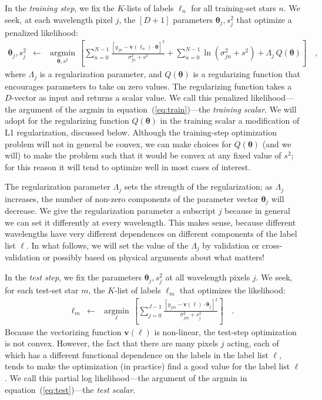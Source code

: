 \documentclass[12pt,preprint]{aastex}
\newcommand{\Dvector}[1]{\boldsymbol{#1}}
\newcommand{\vectheta}{\Dvector{\theta}}
\newcommand{\vecv}{\Dvector{v}}
\newcommand{\argmin}[1]{\underset{#1}{\operatorname{argmin}}\,}
\begin{document}
In the \emph{training step}, we fix the $K$-lists of labels $\ell_n$
for all training-set stars $n$.
We seek, at each wavelength pixel $j$, the $[D+1]$ parameters
$\vectheta_j,s^2_j$ that optimize a penalized likelihood:
\begin{eqnarray}\label{eq:train}
  \vectheta_j,s^2_j &\leftarrow& \argmin{\vectheta,s^2}\left[
    \sum_{n=0}^{N-1} \frac{[y_{jn}-\vecv(\ell_n)\cdot\vectheta]^2}{\sigma^2_{jn}+s^2}
    + \sum_{n=0}^{N-1} \ln(\sigma^2_{jn}+s^2)
    + \Lambda_j\,Q(\vectheta)
    \right]
  \quad ,
\end{eqnarray}
where $\Lambda_j$ is a regularization parameter, and $Q(\vectheta)$ is a 
regularizing function that encourages parameters to take on zero values.
The regularizing function takes a $D$-vector as input and returns a
scalar value.
We call this penalized likelihood---the argument of the
argmin in equation~(\ref{eq:train})---the \emph{training scalar}.
We will adopt for the regularizing function $Q(\vectheta)$ in the training scalar a
modification of L1 regularization, discussed below.
Although the training-step optimization problem will not in general be
convex, we can make choices for $Q(\vectheta)$ (and we will) to make the
problem such that it would be convex at any fixed value of $s^2$; for
this reason it will tend to optimize well in most cases of interest.

The regularization parameter $\Lambda_j$ sets the strength of the
regularization; as $\Lambda_j$ increases, the number of non-zero
components of the parameter vector $\vectheta_j$ will decrease.
We give the regularization parameter a subscript $j$ because in
general we can set it differently at every wavelength.
This makes sense, because different wavelengths have very different
dependences on different components of the label list $\ell$.
In what follows, we will set the value of the $\Lambda_j$ by
validation or cross-validation or possibly based on physical arguments
about what matters!

In the \emph{test step}, we fix the parameters $\vectheta_j,s^2_j$ at all
wavelength pixels $j$.
We seek, for each test-set star $m$, the $K$-list of labels $\ell_m$
that optimizes the likelihood:
\begin{eqnarray}\label{eq:test}
  \ell_m &\leftarrow& \argmin{\ell}\left[
    \sum_{j=0}^{J-1} \frac{[y_{jm}-\vecv(\ell)\cdot\vectheta_j]^2}{\sigma^2_{jm}+s^2_j}
    \right]
  \quad .
\end{eqnarray}
Because the vectorizing function $\vecv(\ell)$ is non-linear, the
test-step optimization is not convex.
However, the fact that there are many pixels $j$ acting, each of which
has a different functional dependence on the labels in the label list
$\ell$, tends to make the optimization (in practice) find a good value
for the label list $\ell$.
We call this partial log likelihood---the argument of the
argmin in equation~(\ref{eq:test})---the \emph{test scalar}.
\end{document}
